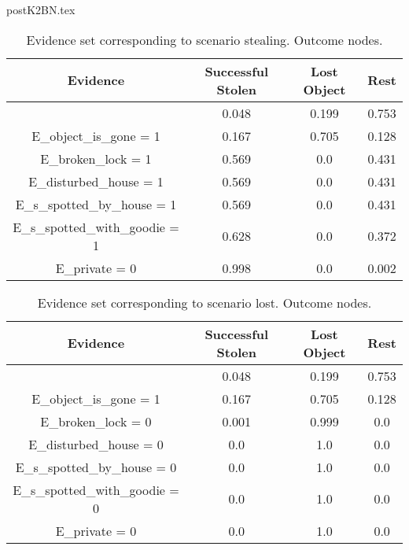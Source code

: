postK2BN.tex\begin{table}\begin{tabular}{c|c|c|c}Evidence & Successful Stolen & Lost Object & Rest \\\hline & 0.048 & 0.199 & 0.753 \\E\_object\_is\_gone = 1 & 0.167 & 0.705 & 0.128 \\E\_broken\_lock = 1 & 0.569 & 0.0 & 0.431 \\E\_disturbed\_house = 1 & 0.569 & 0.0 & 0.431 \\E\_s\_spotted\_by\_house = 1 & 0.569 & 0.0 & 0.431 \\E\_s\_spotted\_with\_goodie = 1 & 0.628 & 0.0 & 0.372 \\E\_private = 0 & 0.998 & 0.0 & 0.002 \\\end{tabular}\caption{Evidence set corresponding to scenario stealing. Outcome nodes.}\end{table}
\begin{table}\begin{tabular}{c|c|c|c}Evidence & Successful Stolen & Lost Object & Rest \\\hline & 0.048 & 0.199 & 0.753 \\E\_object\_is\_gone = 1 & 0.167 & 0.705 & 0.128 \\E\_broken\_lock = 0 & 0.001 & 0.999 & 0.0 \\E\_disturbed\_house = 0 & 0.0 & 1.0 & 0.0 \\E\_s\_spotted\_by\_house = 0 & 0.0 & 1.0 & 0.0 \\E\_s\_spotted\_with\_goodie = 0 & 0.0 & 1.0 & 0.0 \\E\_private = 0 & 0.0 & 1.0 & 0.0 \\\end{tabular}\caption{Evidence set corresponding to scenario lost. Outcome nodes.}\end{table}